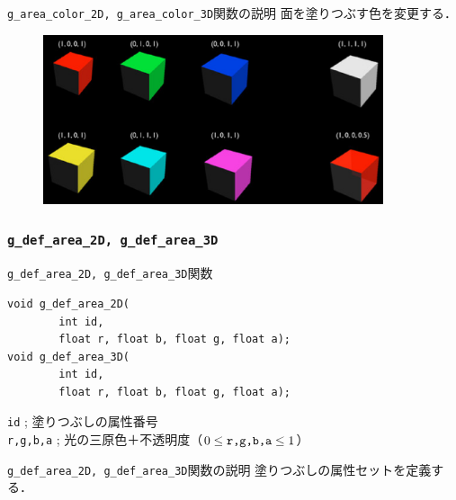 \documentclass[platex,a4paper,12pt]{jsarticle}%
\begin{document}
\begin{itembox}[l]{\texttt{g\_area\_color\_2D, g\_area\_color\_3D}関数の説明}
面を塗りつぶす色を変更する．
\end{itembox}

\begin{figure}[htb]
\centering
\includegraphics[width=100mm]{Canvas_g_area_color.eps}
\end{figure}

\clearpage
\subsubsection{\texttt{g\_def\_area\_2D, g\_def\_area\_3D}}

\begin{itembox}[l]{\texttt{g\_def\_area\_2D, g\_def\_area\_3D}関数}
\begin{verbatim}
void g_def_area_2D(
        int id,	
        float r, float b, float g, float a);
void g_def_area_3D(
        int id,	
        float r, float b, float g, float a);
\end{verbatim}
\verb|id| ; 塗りつぶしの属性番号\\
\verb|r,g,b,a| ; 光の三原色＋不透明度（$0\leq \verb|r,g,b,a| \leq 1$）
\end{itembox}

\begin{itembox}[l]{\texttt{g\_def\_area\_2D, g\_def\_area\_3D}関数の説明}
塗りつぶしの属性セットを定義する．
\end{itembox}

\end{document}
